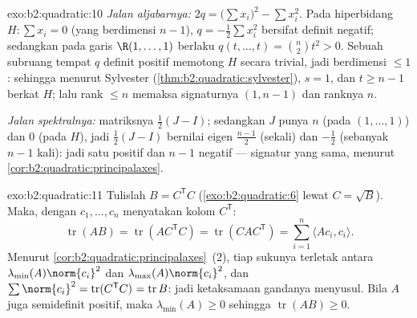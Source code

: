 \begin{solution}{exo:b2:quadratic:10}
\emph{Jalan aljabarnya:} $2q = \bigl(\sum x_i\bigr)^2 - \sum
x_i^2$. Pada hiperbidang $H : \sum x_i = 0$ (yang berdimensi $n -
1$), $q = -\frac12\sum x_i^2$ bersifat definit negatif; sedangkan pada garis
$\R(1, \dots, 1)$ berlaku $q(t, \dots, t) = \binom n2 t^2 > 0$. Sebuah
subruang tempat $q$ definit positif memotong $H$ secara trivial, jadi
berdimensi $\leq 1$: sehingga menurut Sylvester
(\cref{thm:b2:quadratic:sylvester}), $s = 1$, dan $t \geq n-1$
berkat $H$; lalu rank $\leq n$ memaksa signaturnya $(1, n-1)$ dan ranknya $n$.

\emph{Jalan spektralnya:} matriksnya $\frac12(J - I)$; sedangkan $J$ punya
 $n$ (pada $(1,\dots,1)$) dan $0$ (pada $H$), jadi
$\frac12(J-I)$ bernilai eigen $\frac{n-1}{2}$ (sekali) dan
$-\frac12$ (sebanyak $n-1$ kali): jadi satu positif dan $n-1$ negatif ---
signatur yang sama, menurut \cref{cor:b2:quadratic:principalaxes}.
\end{solution}

\begin{solution}{exo:b2:quadratic:11}
Tulislah $B = C^{\mathsf T}C$ (\cref{exo:b2:quadratic:6} lewat $C =
\sqrt B$). Maka, dengan $c_1, \dots, c_n$ menyatakan kolom
$C^{\mathsf T}$:
\[
\operatorname{tr}(AB) = \operatorname{tr}(AC^{\mathsf T}C)
= \operatorname{tr}(CAC^{\mathsf T})
= \sum_{i=1}^n \langle A c_i, c_i\rangle .
\]
Menurut \cref{cor:b2:quadratic:principalaxes}~(2), tiap sukunya terletak
antara $\lambda_{\min}(A)\norm{c_i}^2$ dan
$\lambda_{\max}(A)\norm{c_i}^2$, dan $\sum\norm{c_i}^2 =
\operatorname{tr}(C^{\mathsf T}C)^{\vphantom1} =
\operatorname{tr} B$: jadi ketaksamaan gandanya menyusul. Bila $A$
juga semidefinit positif, maka $\lambda_{\min}(A) \geq 0$ sehingga
$\operatorname{tr}(AB) \geq 0$.
\end{solution}

